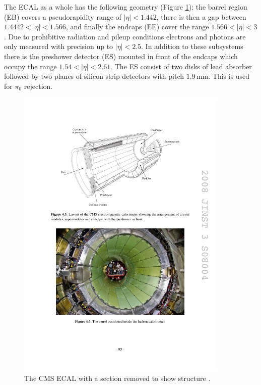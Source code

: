 The ECAL as a whole has the following geometry (Figure \ref{fig:apparatus:ecal}): the barrel region (EB) covers a pseudorapidity range of $|\eta|<1.442$, there is then a gap between $1.4442<|\eta|<1.566$, and finally the endcaps (EE) cover the range $1.566<|\eta|<3$. Due to prohibitive radiation and pileup conditions electrons and photons are only measured with precision up to $|\eta|<2.5$. 
In addition to these subsystems there is the preshower detector (ES) mounted in front of the endcaps which occupy the range $1.54<|\eta|<2.61$. The ES consist of two disks of lead absorber followed by two planes of silicon strip detectors with pitch $1.9$\,mm. This is used for $\pi_{0}$ rejection. 
\begin{figure}[h!]
    \includegraphics[width=0.9\textwidth]{figures/apparatus/ECAL_alt.pdf}
    \caption{The CMS ECAL with a section removed to show structure \cite{CMSatLHC}.}
    \label{fig:apparatus:ecal}
\end{figure}

